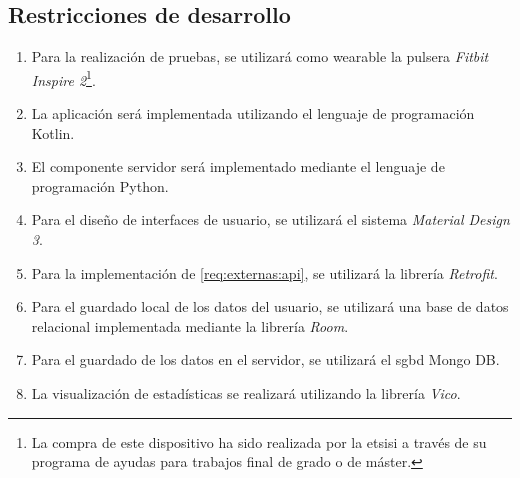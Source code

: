     \subsection{Restricciones de desarrollo}
        \label{req:externas:restricciones}
        \begin{enumerate}[label=\textbf{\texttt{RD-\arabic*}}]
            \item Para la realización de pruebas, se utilizará como \gls{wearable} la pulsera \textit{Fitbit Inspire 2}\footnote{La compra de este dispositivo ha sido realizada por la \gls{etsisi} a través de su programa de ayudas para trabajos final de grado o de máster.}.
            \item La aplicación será implementada utilizando el lenguaje de programación Kotlin.
            \item El componente servidor será implementado mediante el lenguaje de programación Python.
            \item Para el diseño de interfaces de usuario, se utilizará el sistema \textit{Material Design 3}.
            \item Para la implementación de \ref{req:externas:api}, se utilizará la librería \textit{Retrofit}.
            \item Para el guardado local de los datos del usuario, se utilizará una base de datos relacional implementada mediante la librería \textit{Room}.
            \item Para el guardado de los datos en el servidor, se utilizará el \gls{sgbd} Mongo DB.
            \item La visualización de estadísticas se realizará utilizando la librería \textit{Vico}.
        \end{enumerate}
        
